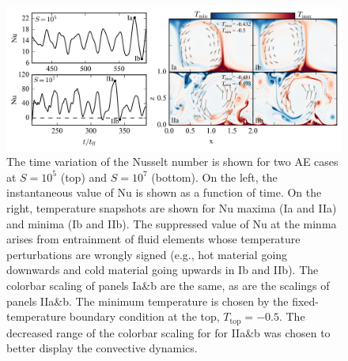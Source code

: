 \begin{figure}[ht!]
\includegraphics[width=\textwidth]{./figs/oscillating_plumes.png}
\caption{The time variation of the Nusselt number is shown for two AE cases at
$S = 10^5$ (top) and $S = 10^7$ (bottom). On the left, the instantaneous value of Nu
is shown as a function of time. On the right, temperature snapshots are shown for
Nu maxima (Ia and IIa) and minima (Ib and IIb). The suppressed value of Nu at the
minma arises from entrainment of fluid elements whose temperature perturbations
are wrongly signed (e.g., hot material going downwards and cold material going
upwards in Ib and IIb). The colorbar scaling of panels Ia\&b are the same, as
are the scalings of panels IIa\&b. 
The minimum temperature is chosen by the fixed-temperature
boundary condition at the top, $T_{\text{top}} = -0.5$. The decreased range of
the colorbar scaling for
for IIa\&b was chosen to better display the convective dynamics.
\label{fig:oscillating_plumes} }
\end{figure}
